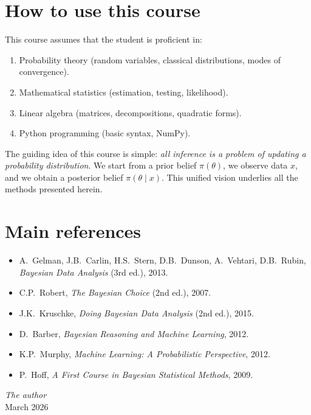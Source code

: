 \section*{How to use this course}

\begin{warning}[title=\textbf{Important prerequisites}]
This course assumes that the student is proficient in:
\begin{enumerate}
  \item Probability theory (random variables, classical distributions,
        modes of convergence).
  \item Mathematical statistics (estimation, testing, likelihood).
  \item Linear algebra (matrices, decompositions, quadratic forms).
  \item Python programming (basic syntax, NumPy).
\end{enumerate}
\end{warning}

\begin{intuition}[title=\textbf{Guiding thread}]
The guiding idea of this course is simple: \textit{all inference is a
problem of updating a probability distribution}. We start from a prior
belief $\pi(\theta)$, we observe data $x$, and we obtain a posterior
belief $\pi(\theta \mid x)$. This unified vision underlies all the
methods presented herein.
\end{intuition}

\section*{Main references}

\begin{itemize}
  \item A.~Gelman, J.B.~Carlin, H.S.~Stern, D.B.~Dunson, A.~Vehtari,
        D.B.~Rubin, \textit{Bayesian Data Analysis} (3rd ed.), 2013.
  \item C.P.~Robert, \textit{The Bayesian Choice} (2nd ed.), 2007.
  \item J.K.~Kruschke, \textit{Doing Bayesian Data Analysis} (2nd ed.),
        2015.
  \item D.~Barber, \textit{Bayesian Reasoning and Machine Learning}, 2012.
  \item K.P.~Murphy, \textit{Machine Learning: A Probabilistic Perspective},
        2012.
  \item P.~Hoff, \textit{A First Course in Bayesian Statistical Methods},
        2009.
\end{itemize}

\bigskip
\begin{flushright}
\textit{The author} \\
March 2026
\end{flushright}
